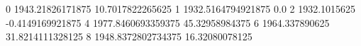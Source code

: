 0 1943.21826171875 10.7017822265625
1 1932.5164794921875 0.0
2 1932.1015625 -0.4149169921875
4 1977.8460693359375 45.32958984375
6 1964.337890625 31.8214111328125
8 1948.8372802734375 16.32080078125
